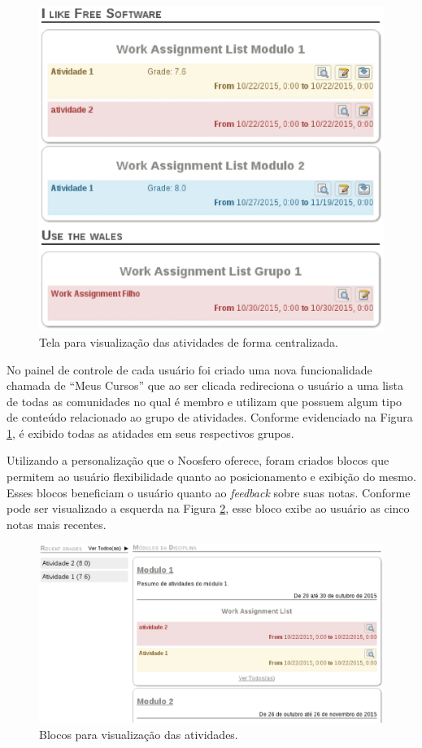 \begin{figure}[h]
    \centering
    \includegraphics[keepaspectratio=true,scale=0.5]
      {figuras/work-assignment-group-list.eps}
    \caption{Tela para visualização das atividades de forma centralizada.}
    \label{fig:group-list}
\end{figure}

No painel de controle de cada usuário foi criado uma nova funcionalidade chamada de ``Meus Cursos'' que ao ser clicada redireciona o usuário a uma lista de todas as comunidades no qual é membro e utilizam que possuem algum tipo de conteúdo relacionado ao grupo de atividades. Conforme evidenciado na Figura \ref{fig:group-list}, é exibido todas as atidades em seus respectivos grupos.

Utilizando a personalização que o Noosfero oferece, foram criados blocos que permitem ao usuário flexibilidade quanto ao posicionamento e exibição do mesmo. Esses blocos beneficiam o usuário quanto ao \textit{feedback} sobre suas notas. Conforme pode ser visualizado a esquerda na Figura \ref{fig:blocos}, esse bloco exibe ao usuário as cinco notas mais recentes.

\begin{figure}[h]
    \centering
    \includegraphics[keepaspectratio=true,scale=0.5]
      {figuras/blocos.eps}
    \caption{Blocos para visualização das atividades.}
    \label{fig:blocos}
\end{figure}



